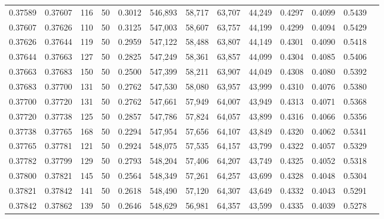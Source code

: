\begin{tabular}{rrrrrrrrrrrrr}
0.37589 & 0.37607 &   116 &  50 &                                     0.3012 & 546,893 &  58,717 &  63,707 &  44,249 & 0.4297 & 0.4099 & 0.5439 \\
0.37607 & 0.37626 &   110 &  50 &                                     0.3125 & 547,003 &  58,607 &  63,757 &  44,199 & 0.4299 & 0.4094 & 0.5429 \\
0.37626 & 0.37644 &   119 &  50 &                                     0.2959 & 547,122 &  58,488 &  63,807 &  44,149 & 0.4301 & 0.4090 & 0.5418 \\
0.37644 & 0.37663 &   127 &  50 &                                     0.2825 & 547,249 &  58,361 &  63,857 &  44,099 & 0.4304 & 0.4085 & 0.5406 \\
0.37663 & 0.37683 &   150 &  50 &                                     0.2500 & 547,399 &  58,211 &  63,907 &  44,049 & 0.4308 & 0.4080 & 0.5392 \\
0.37683 & 0.37700 &   131 &  50 &                                     0.2762 & 547,530 &  58,080 &  63,957 &  43,999 & 0.4310 & 0.4076 & 0.5380 \\
0.37700 & 0.37720 &   131 &  50 &                                     0.2762 & 547,661 &  57,949 &  64,007 &  43,949 & 0.4313 & 0.4071 & 0.5368 \\
0.37720 & 0.37738 &   125 &  50 &                                     0.2857 & 547,786 &  57,824 &  64,057 &  43,899 & 0.4316 & 0.4066 & 0.5356 \\
0.37738 & 0.37765 &   168 &  50 &                                     0.2294 & 547,954 &  57,656 &  64,107 &  43,849 & 0.4320 & 0.4062 & 0.5341 \\
0.37765 & 0.37781 &   121 &  50 &                                     0.2924 & 548,075 &  57,535 &  64,157 &  43,799 & 0.4322 & 0.4057 & 0.5329 \\
0.37782 & 0.37799 &   129 &  50 &                                     0.2793 & 548,204 &  57,406 &  64,207 &  43,749 & 0.4325 & 0.4052 & 0.5318 \\
0.37800 & 0.37821 &   145 &  50 &                                     0.2564 & 548,349 &  57,261 &  64,257 &  43,699 & 0.4328 & 0.4048 & 0.5304 \\
0.37821 & 0.37842 &   141 &  50 &                                     0.2618 & 548,490 &  57,120 &  64,307 &  43,649 & 0.4332 & 0.4043 & 0.5291 \\
0.37842 & 0.37862 &   139 &  50 &                                     0.2646 & 548,629 &  56,981 &  64,357 &  43,599 & 0.4335 & 0.4039 & 0.5278 \\

\end{tabular}
